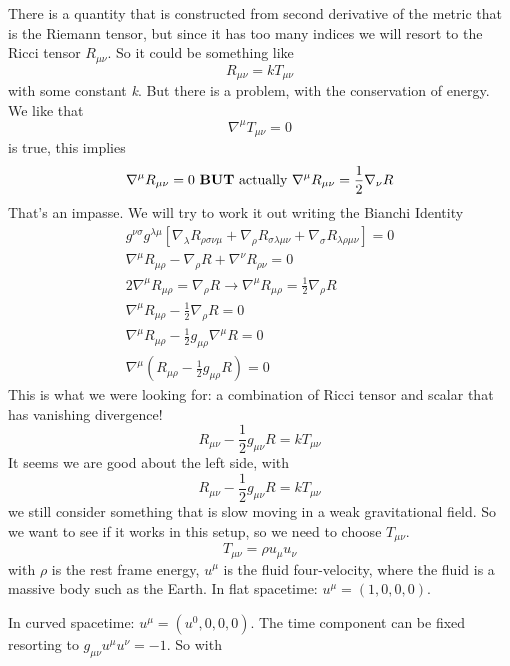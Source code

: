 There is a quantity that is constructed from second derivative of the metric that is the Riemann tensor, but since it has too many indices we will resort to the Ricci tensor $R_{\mu \nu }$. So it could be something like
\[
R_{\mu \nu } = k T_{\mu \nu }
\]
with some constant \emph{k}. But there is a problem, with the conservation of energy. We like that 
\[
\nabla ^{\mu }T_{\mu \nu } = 0
\]
is true, this implies
\[
\nabla ^{\mu }R_{\mu \nu } = 0 \text{ \textbf{BUT} actually  } \nabla^{\mu }R_{\mu \nu } = \frac{1}{2}\nabla _{\nu }R
\]
That's an impasse. We will try to work it out writing the Bianchi Identity
\begin{gather*}
	g^{\nu \sigma }g^{\lambda \mu } \left[ \nabla _{\lambda }R_{\rho \sigma \nu \mu } + \nabla _{\rho }R_{\sigma \lambda \mu \nu } + \nabla _{\sigma }R_{\lambda \rho \mu \nu }\right] =0 \\
	\nabla ^{\mu }R_{\mu \rho }- \nabla _{\rho }R	+ \nabla ^{\nu }R_{\rho \nu } =0\\
	2\nabla ^{\mu }R_{\mu \rho } = \nabla _{\rho }R \to \nabla^{\mu }R_{\mu \rho } = \frac{1}{2} \nabla _{\rho }R \\
	\nabla ^{\mu }R_{\mu \rho } - \frac{1}{2} \nabla _{\rho }R = 0 \\
	\nabla ^{\mu }R_{\mu \rho } - \frac{1}{2} g_{\mu \rho } \nabla ^{\mu }R = 0 \\
	\nabla ^{\mu } \left( R_{\mu \rho } - \frac{1}{2} g_{\mu \rho }R \right) = 0
\end{gather*}
This is what we were looking for: a combination of Ricci tensor and scalar that has vanishing divergence!
\begin{equation}
R_{\mu \nu } - \frac{1}{2}g_{\mu \nu }R = k T_{\mu \nu }
\end{equation}
It seems we are good about the left side, with
\begin{equation}
R_{\mu \nu } - \frac{1}{2} g_{\mu \nu } R = kT_{\mu \nu }
\end{equation}
we still consider something that is slow moving in a weak gravitational field. So we want to see if it works in this setup, so we need to choose $T_{\mu \nu }$.
\[
	T_{\mu \nu } = \rho  u_{\mu }u_{\nu }
\]
with $\rho $ is the rest frame energy, $u^{\mu }$ is the fluid four-velocity, where the fluid is a massive body such as the Earth.
In flat spacetime: $u^{\mu } = \left( 1,0,0,0 \right)$. \par
In curved spacetime: $u^{\mu } = \left( u^{0}, 0,0,0 \right)$.
The time component can be fixed resorting to $g_{\mu \nu }u^{\mu }u^{\nu } = -1$. So with
